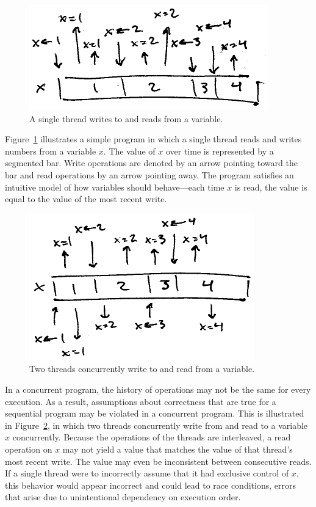 \documentclass{sig-alternate}
\begin{document}
\begin{figure}[h]
  \centering
  \includegraphics{single-thread-read-write}
  \caption{A single thread writes to and reads from a variable.}
\label{figure:single}
\end{figure}

Figure~\ref{figure:single} illustrates a simple program in which a single thread reads and writes numbers from a variable $x$. The value of $x$ over time is represented by a segmented bar. Write operations are denoted by an arrow pointing toward the bar and read operations by an arrow pointing away. The program satisfies an intuitive model of how variables should behave---each time $x$ is read, the value is equal to the value of the most recent write.

\begin{figure}[h]
  \centering
  \includegraphics{multiple-threads-read-write}
  \caption{Two threads concurrently write to and read from a variable.}
\label{figure:multiple}
\end{figure}

In a concurrent program, the history of operations may not be the same for every execution. As a result, assumptions about correctness that are true for a sequential program may be violated in a concurrent program. This is illustrated in Figure~\ref{figure:multiple}, in which two threads concurrently write from and read to a variable $x$ concurrently. Because the operations of the threads are interleaved, a read operation on $x$ may not yield a value that matches the value of that thread's most recent write. The value may even be inconsistent between consecutive reads. If a single thread were to incorrectly assume that it had exclusive control of $x$, this behavior would appear incorrect and could lead to race conditions, errors that arise due to unintentional dependency on execution order.
\end{document}
